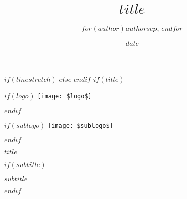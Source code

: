 \documentclass[UTF8]{ctexart}
\title{$title$}
\author{$for(author)$$author$$sep$, $endfor$} %
\date{$date$}
\let\OriginalPandocGraphixIncludeGraphics\includegraphics
\renewcommand{\includegraphics}[2][]{%
  \OriginalPandocGraphixIncludeGraphics[
    max width=\linewidth,      %
    max height=0.8\textheight, %
    keepaspectratio,
    #1
  ]{#2}%
}
\begin{document}
\songti %

$if(linestretch)$
$else$
\onehalfspacing %
$endif$
$if(title)$ %
\begin{titlepage}
  \centering
  \thispagestyle{empty} %

  $if(logo)$
  \texttt{[image: \$logo\$]}\par
  \vspace{1cm} %
  $endif$

  $if(sublogo)$ %
  \texttt{[image: \$sublogo\$]}\par %
  \vspace{1cm} %
  $endif$

  {\bfseries{} $title$\par} %
  \vspace{0.5cm} %

  $if(subtitle)$
  {\itshape{} $subtitle$\par} %
  \vspace{1cm} %
  $endif$



\end{titlepage}
\end{document}
